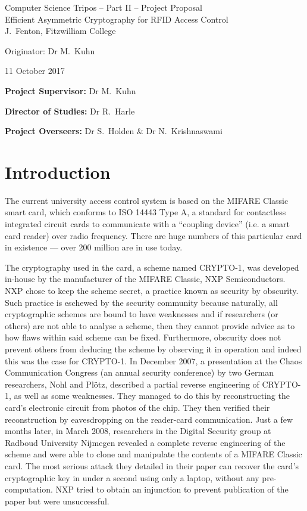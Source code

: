 \documentclass[12pt,a4paper,twoside]{article}
\begin{document}
\begin{center}
\Large
Computer Science Tripos -- Part II -- Project Proposal\\[4mm]
\LARGE
Efficient Asymmetric Cryptography for RFID Access Control\\[4mm]

\large
J.~Fenton, Fitzwilliam College

Originator: Dr M.~Kuhn

11 October 2017
\end{center}

\vspace{5mm}

\textbf{Project Supervisor:} Dr M.~Kuhn

\textbf{Director of Studies:} Dr R.~Harle

\textbf{Project Overseers:} Dr S.~Holden  \& Dr N.~Krishnaswami


\section*{Introduction}

The current university access control system is based on the MIFARE Classic smart card, which conforms to ISO 14443 Type A, a standard for contactless integrated circuit cards to communicate with a ``coupling device'' (i.e. a smart card reader) over radio frequency. There are huge numbers of this particular card in existence --- over 200 million are in use today.

The cryptography used in the card, a scheme named CRYPTO-1, was developed in-house by the manufacturer of the MIFARE Classic, NXP Semiconductors. NXP chose to keep the scheme secret, a practice known as security by obscurity. Such practice is eschewed by the security community because naturally, all cryptographic schemes are bound to have weaknesses and if researchers (or others) are not able to analyse a scheme, then they cannot provide advice as to how flaws within said scheme can be fixed. Furthermore, obscurity does not prevent others from deducing the scheme by observing it in operation and indeed this was the case for CRYPTO-1. In December 2007, a presentation at the Chaos Communication Congress (an annual security conference) by two German researchers, Nohl and Pl{\"o}tz, described a partial reverse engineering of CRYPTO-1, as well as some weaknesses. They managed to do this by reconstructing the card's electronic circuit from photos of the chip. They then verified their reconstruction by eavesdropping on the reader-card communication. Just a few months later, in March 2008, researchers in the Digital Security group at Radboud University Nijmegen revealed a complete reverse engineering of the scheme and were able to clone and manipulate the contents of a MIFARE Classic card. The most serious attack they detailed in their paper can recover the card's cryptographic key in under a second using only a laptop, without any pre- computation. NXP tried to obtain an injunction to prevent publication of the paper but were unsuccessful.
\end{document}
